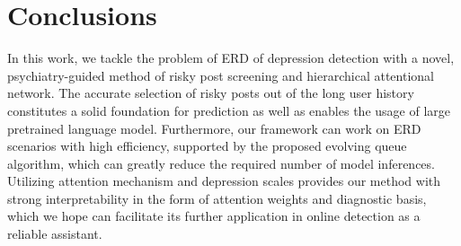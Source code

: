 \section{Conclusions}

In this work, we tackle the problem of ERD of depression detection with a novel, psychiatry-guided method of risky post screening and hierarchical attentional network. The accurate selection of risky posts out of the long user history constitutes a solid foundation for prediction as well as enables the usage of large pretrained language model. Furthermore, our framework can work on ERD scenarios with high efficiency, supported by the proposed evolving queue algorithm, which can greatly reduce the required number of model inferences. Utilizing attention mechanism and depression scales provides our method with strong interpretability in the form of attention weights and diagnostic basis, which we hope can facilitate its further application in online detection as a reliable assistant.

